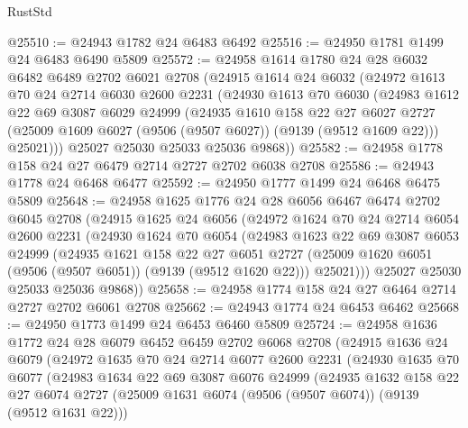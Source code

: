 \begin{lexlean}{RustStd}
\begin{coremodule}
@25510 := @24943 @1782 @24 @6483 @6492
@25516 := @24950 @1781 @1499 @24 @6483 @6490 @5809
@25572 := @24958
    @1614
    @1780
    @24
    @28
    @6032
    @6482
    @6489
    @2702
    @6021
    @2708
    (@24915
      @1614
      @24
      @6032
      (@24972
        @1613
        @70
        @24
        @2714
        @6030
        @2600
        @2231
        (@24930
          @1613
          @70
          @6030
          (@24983
            @1612
            @22
            @69
            @3087
            @6029
            @24999
            (@24935
              @1610
              @158
              @22
              @27
              @6027
              @2727
              (@25009 @1609 @6027 (@9506 (@9507 @6027)) (@9139 (@9512 @1609 @22)))
              @25021)))
        @25027
        @25030
        @25033
        @25036
        @9868))
@25582 := @24958 @1778 @158 @24 @27 @6479 @2714 @2727 @2702 @6038 @2708
@25586 := @24943 @1778 @24 @6468 @6477
@25592 := @24950 @1777 @1499 @24 @6468 @6475 @5809
@25648 := @24958
    @1625
    @1776
    @24
    @28
    @6056
    @6467
    @6474
    @2702
    @6045
    @2708
    (@24915
      @1625
      @24
      @6056
      (@24972
        @1624
        @70
        @24
        @2714
        @6054
        @2600
        @2231
        (@24930
          @1624
          @70
          @6054
          (@24983
            @1623
            @22
            @69
            @3087
            @6053
            @24999
            (@24935
              @1621
              @158
              @22
              @27
              @6051
              @2727
              (@25009 @1620 @6051 (@9506 (@9507 @6051)) (@9139 (@9512 @1620 @22)))
              @25021)))
        @25027
        @25030
        @25033
        @25036
        @9868))
@25658 := @24958 @1774 @158 @24 @27 @6464 @2714 @2727 @2702 @6061 @2708
@25662 := @24943 @1774 @24 @6453 @6462
@25668 := @24950 @1773 @1499 @24 @6453 @6460 @5809
@25724 := @24958
    @1636
    @1772
    @24
    @28
    @6079
    @6452
    @6459
    @2702
    @6068
    @2708
    (@24915
      @1636
      @24
      @6079
      (@24972
        @1635
        @70
        @24
        @2714
        @6077
        @2600
        @2231
        (@24930
          @1635
          @70
          @6077
          (@24983
            @1634
            @22
            @69
            @3087
            @6076
            @24999
            (@24935
              @1632
              @158
              @22
              @27
              @6074
              @2727
              (@25009 @1631 @6074 (@9506 (@9507 @6074)) (@9139 (@9512 @1631 @22)))

\end{coremodule}
\end{lexlean}
